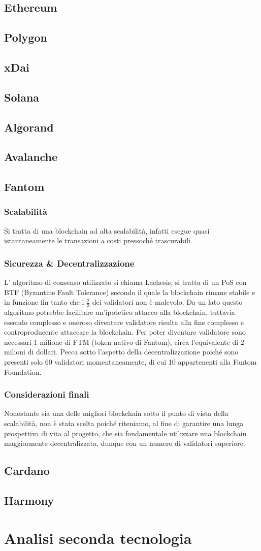 \documentclass[a4paper, 12pt]{article}
\begin{document}
\subsection*{Ethereum}
\subsection*{Polygon}
\subsection*{xDai}
\subsection*{Solana}
\subsection*{Algorand}
\subsection*{Avalanche}
\subsection*{Fantom}
\subsubsection*{Scalabilità}
Si tratta di una blockchain ad alta scalabilità, infatti esegue quasi istantaneamente le transazioni a costi pressoché trascurabili.
\subsubsection*{Sicurezza \& Decentralizzazione}
L' algoritmo di consenso utilizzato si chiama Lachesis, si tratta di un PoS con BTF (Byzantine Fault Tolerance) secondo il quale la blockchain rimane stabile e in funzione fin tanto che i $\frac{2}{3}$ dei validatori non è malevolo.
Da un lato questo algoritmo potrebbe facilitare un'ipotetico attacco alla blockchain, tuttavia essendo complesso e oneroso diventare validatore risulta alla fine complesso e controproducente attaccare la blockchain.
Per poter diventare validatore sono necessari 1 milione di FTM (token nativo di Fantom), circa l’equivalente di 2 milioni di dollari.
Pecca sotto l’aspetto della decentralizzazione poiché sono presenti solo 60 validatori momentaneamente, di cui 10 appartenenti alla Fantom Foundation.
\subsubsection*{Considerazioni finali}
Nonostante sia una delle migliori blockchain sotto il punto di vista della scalabilità, non è stata scelta poiché riteniamo, al fine di garantire una lunga prospettiva di vita al progetto, che sia fondamentale utilizzare una blockchain maggiormente decentralizzata, dunque con un numero di validatori superiore.
\subsection*{Cardano}
\subsection*{Harmony}
\section{Analisi seconda tecnologia}
\end{document}
